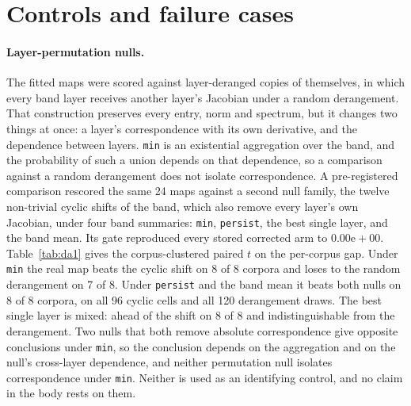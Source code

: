 \documentclass{article}
\newcommand{\mn}{\texttt{min}}
\newcommand{\pe}{\texttt{persist}}
\begin{document}
\tblvariance
\tblladder
\tblbaseline
\tblfamily
\tblcompetence
\tblposition
\tblcrossover
\tblgrid


\section{Controls and failure cases}
\label{app:controls}

\paragraph{Layer-permutation nulls.} The fitted maps were scored against layer-deranged copies of
themselves, in which every band layer receives another layer's Jacobian under a random derangement. That construction preserves every entry, norm and
spectrum, but it changes two things at once: a layer's correspondence with its own derivative, and
the dependence between layers. \mn{} is an existential aggregation over the band, and the
probability of such a union depends on that dependence, so a comparison against a random
derangement does not isolate correspondence. A pre-registered comparison rescored the same 24
maps against a second null family, the twelve non-trivial cyclic shifts of the band, which
also remove every layer's own Jacobian, under four band summaries: \mn, \pe, the best single layer,
and the band mean. Its gate reproduced every stored corrected arm to $0.00\mathrm{e}{+}00$.
Table~\ref{tab:da1} gives the corpus-clustered paired $t$ on the per-corpus gap. Under \mn{} the
real map beats the cyclic shift on 8 of 8 corpora and loses to the random derangement on 7 of
8. Under \pe{} and the band mean it beats both nulls on 8 of 8 corpora, on all 96 cyclic cells and
all 120 derangement draws. The best single layer is mixed: ahead of the shift on 8 of 8 and
indistinguishable from the derangement. Two nulls that both remove absolute correspondence give opposite conclusions under \mn, so the
conclusion depends on the aggregation and on the null's cross-layer dependence, and neither permutation null
isolates correspondence under \mn. Neither is used as an identifying control, and no claim in the
body rests on them.
\end{document}
